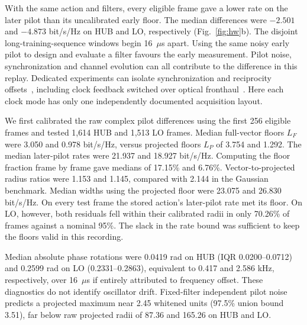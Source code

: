 \documentclass[lineno,pdflatex,sn-nature]{sn-jnl}
\begin{document}
With the same action and filters, every eligible frame gave a lower rate on the later pilot than its uncalibrated early floor. The median differences were \(-2.501\) and \(-4.873\) bit/s/Hz on HUB and LO, respectively (Fig.~\ref{fig:hw}b). The disjoint long-training-sequence windows begin 16~\(\mu\)s apart. Using the same noisy early pilot to design and evaluate a filter favours the early measurement. Pilot noise, synchronization and channel evolution can all contribute to the difference in this replay. Dedicated experiments can isolate synchronization and reciprocity offsets~\cite{rogalin,vieira,ganesan}, including clock feedback switched over optical fronthaul~\cite{zhangsync2026}. Here each clock mode has only one independently documented acquisition layout.

We first calibrated the raw complex pilot differences using the first 256 eligible frames and tested 1,614 HUB and 1,513 LO frames. Median full-vector floors \(L_F\) were 3.050 and 0.978 bit/s/Hz, versus projected floors \(L_P\) of 3.754 and 1.292. The median later-pilot rates were 21.937 and 18.927 bit/s/Hz. Computing the floor fraction frame by frame gave medians of 17.15\% and 6.76\%. Vector-to-projected radius ratios were 1.153 and 1.145, compared with 2.144 in the Gaussian benchmark. Median widths using the projected floor were 23.075 and 26.830 bit/s/Hz. On every test frame the stored action's later-pilot rate met its floor. On LO, however, both residuals fell within their calibrated radii in only 70.26\% of frames against a nominal 95\%. The slack in the rate bound was sufficient to keep the floors valid in this recording.


Median absolute phase rotations were 0.0419 rad on HUB (IQR 0.0200--0.0712) and 0.2599 rad on LO (0.2331--0.2863), equivalent to 0.417 and 2.586 kHz, respectively, over 16~\(\mu\)s if entirely attributed to frequency offset. These diagnostics do not identify oscillator drift. Fixed-filter independent pilot noise predicts a projected maximum near 2.45 whitened units (97.5\% union bound 3.51), far below raw projected radii of 87.36 and 165.26 on HUB and LO.
\end{document}

